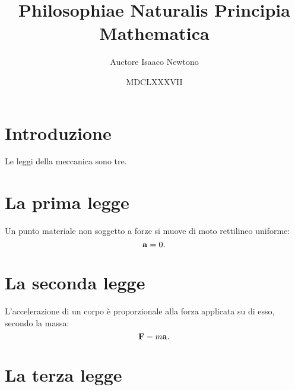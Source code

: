 \documentclass{article}
\title{Philosophiae Naturalis Principia Mathematica}
\author{Auctore Isaaco Newtono}
\date{MDCLXXXVII}
\begin{document}
\maketitle

\section{Introduzione}
Le leggi della meccanica sono tre.

\section{La prima legge}
Un punto materiale non soggetto a forze si muove di moto rettilineo uniforme:
\begin{equation}
	\vb a = 0.
\end{equation}

\section{La seconda legge}
L'accelerazione di un corpo \`e proporzionale alla forza applicata su di esso, secondo la massa:
\begin{equation}
	\vb F = m \vb a.
\end{equation}

\section{La terza legge}
\end{document}
